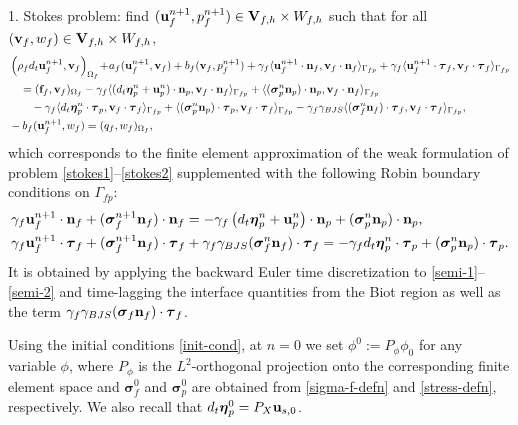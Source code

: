 \documentclass[11pt]{article}
\def\u{{\bf u}}
\def\bv{{\bf v}}
\def\n{{\bf n}}
\def\f{{\bf f}}
\def\btau{\boldsymbol{\tau}}
\def\bbeta{\boldsymbol{\eta}}
\def\bs{\boldsymbol{\sigma}}
\def\V{{\bf V}}
\def\O{\Omega}
\def\<{\langle}
\def\>{\rangle}
\def\dt{d_t}
\begin{document}
1. Stokes problem: find $(\u_{f}^{n+1}, p_{f}^{n+1}) \in \V_{f,h}\times W_{f,h}$ such that for all $(\bv_f,w_f) \in \V_{f,h}\times W_{f,h}$,
%
\begin{align}
  & \left(\rho_f {\dt \u_{f}^{n+1}},\bv_{f}\right)_{\O_f} \! + \! a_{f}(\u_{f}^{n+1},\bv_{f}) + b_f(\bv_{f},p_{f}^{n+1})
  + \gamma_f\<\u_f^{n+1}\cdot\n_f,\bv_f\cdot\n_f\>_{\Gamma_{fp}}
  +  \gamma_f\<\u_f^{n+1}\cdot\btau_{f},\bv_f\cdot\btau_{f}\>_{\Gamma_{fp}}
  \nonumber \\
  & \quad  
  = (\f_{f},\bv_{f})_{\O_f}
  - \gamma_f\<(\dt\bbeta_p^n + \u_p^n)\cdot\n_p,\bv_f\cdot\n_{f}\>_{\Gamma_{fp}} 
  + \<(\bs_p^n \n_p)\cdot\n_p,\bv_f\cdot\n_{f}\>_{\Gamma_{fp}}
  \nonumber \\
  & \qquad
  - \gamma_f\<\dt\bbeta_p^n\cdot\btau_p,\bv_f\cdot\btau_{f}\>_{\Gamma_{fp}}
  + \<(\bs_p^n\n_p)\cdot\btau_p,\bv_f\cdot\btau_{f}\>_{\Gamma_{fp}} 
  - \gamma_f\gamma_{BJS}\<(\bs_f^{n}\n_f)\cdot\btau_{f},\bv_f\cdot\btau_{f}\>_{\Gamma_{fp}}, \\
  & - b_f(\u^{n+1}_{f},w_{f}) = (q_{f},w_{f})_{\O_f},
\end{align}
%
which corresponds to the {finite element approximation} of the weak formulation of problem \eqref{stokes1}--\eqref{stokes2} supplemented with
the following Robin boundary conditions on $\Gamma_{fp}$:
%
\begin{subequations}\label{stokes-robin-mu}
\begin{align}
  & \gamma_f\u_f^{n+1}\cdot\n_f + (\bs_f^{n+1} \n_f)\cdot\n_f =
  -\gamma_f \left(\dt\bbeta_p^n + \u_p^n\right)\cdot\n_p + (\bs_p^n \n_p)\cdot\n_p,
  \label{stokes-robin-mu-1} \\
  &\gamma_f\u_f^{n+1}\cdot\btau_{f}
  + (\bs_f^{n+1}\n_f)\cdot\btau_{f}
  + \gamma_f\gamma_{BJS}(\bs_f^{n}\n_f)\cdot\btau_{f}
  = - \gamma_f \dt\bbeta_p^n\cdot\btau_{p} + (\bs_p^n\n_p)\cdot\btau_{p}.
  \label{stokes-robin-mu-2}
\end{align}
\end{subequations}
%
It is obtained by applying the backward Euler time discretization to \eqref{semi-1}--\eqref{semi-2} and time-lagging the interface quantities from the Biot region as well as the term $\gamma_f\gamma_{BJS}(\bs_f\n_f)\cdot\btau_{f}$.

Using the initial conditions \eqref{init-cond}, at $n = 0$ we set
  $\phi^0 := P_\phi\phi_0$ for any variable $\phi$, where $P_\phi$ is the $L^2$-orthogonal projection onto the corresponding finite element space and 
$\bs_f^0$ and $\bs_p^0$ are obtained from \eqref{sigma-f-defn} and \eqref{stress-defn}, respectively. We also recall that $\dt\bbeta_{p}^0 = P_X\u_{s,0}$.
\end{document}
